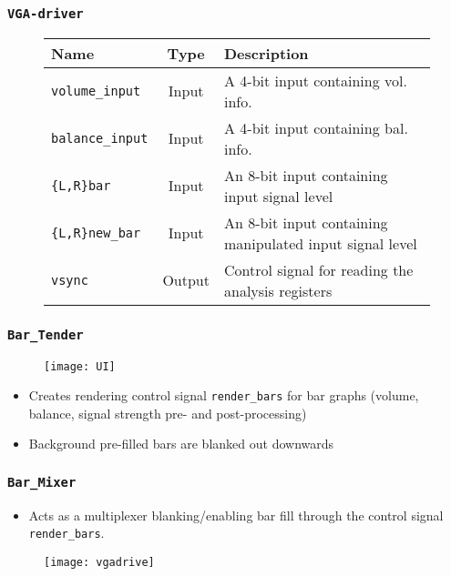 \begin{frame}
  \frametitle{\texttt{VGA-driver}}
    \begin{figure}
      \centering
      \small{
        \begin{tabular}{|l|c|p{6.2cm}|}
          \hline
          Name & Type & Description \\
          \hline
          \texttt{volume\_input} & Input & A 4-bit input containing vol. info.\\
          \hline
          \texttt{balance\_input} & Input & A 4-bit input containing bal. info.\\
          \hline
          \texttt{\{L,R\}bar} & Input & An 8-bit input containing input signal level\\
          \hline
          \texttt{\{L,R\}new\_bar} & Input & An 8-bit input containing manipulated input signal level\\
          \hline
          \texttt{vsync} & Output & Control signal for reading the analysis registers\\
          \hline
        \end{tabular}
      }
    \end{figure}
\end{frame}

\begin{frame}
  \frametitle{\texttt{Bar\_Tender}}
    \begin{figure}
      \centering
      \texttt{[image: UI]}
    \end{figure}
    \begin{itemize}
      \item Creates rendering control signal \texttt{render\_bars} for bar graphs (volume, balance, signal strength pre- and post-processing)
      \item Background pre-filled bars are blanked out downwards
    \end{itemize}

\end{frame}

\begin{frame}
  \frametitle{\texttt{Bar\_Mixer}}
    \begin{itemize}
      \item Acts as a multiplexer blanking/enabling bar fill through the control signal \texttt{render\_bars}.
    \end{itemize}
    \begin{figure}
      \centering
      \texttt{[image: vgadrive]}
    \end{figure}
\end{frame}
